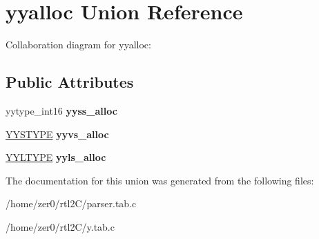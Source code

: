 \hypertarget{unionyyalloc}{}\section{yyalloc Union Reference}
\label{unionyyalloc}


Collaboration diagram for yyalloc\+:
\subsection*{Public Attributes}
\begin{DoxyCompactItemize}
\item 
\mbox{\label{unionyyalloc_a4800e0520a89a4789afa7b5d82197e65}} 
yytype\+\_\+int16 {\bfseries yyss\+\_\+alloc}
\item 
\mbox{\label{unionyyalloc_a9326f4fdc6f737a929444427836d8928}} 
\hyperlink{union_y_y_s_t_y_p_e}{Y\+Y\+S\+T\+Y\+PE} {\bfseries yyvs\+\_\+alloc}
\item 
\mbox{\label{unionyyalloc_a542e43248e6afac9af342c2f4e3162fc}} 
\hyperlink{struct_y_y_l_t_y_p_e}{Y\+Y\+L\+T\+Y\+PE} {\bfseries yyls\+\_\+alloc}
\end{DoxyCompactItemize}


The documentation for this union was generated from the following files\+:\begin{DoxyCompactItemize}
\item 
/home/zer0/rtl2\+C/parser.\+tab.\+c\item 
/home/zer0/rtl2\+C/y.\+tab.\+c\end{DoxyCompactItemize}

